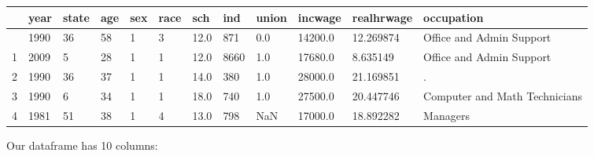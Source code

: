 \documentclass[
  letterpaper,
  DIV=11,
  numbers=noendperiod]{scrreprt}
\begin{document}
\begin{longtable}[]{@{}llllllllllll@{}}
\toprule\noalign{}
& year & state & age & sex & race & sch & ind & union & incwage &
realhrwage & occupation \\
\midrule\noalign{}
\endhead
\bottomrule\noalign{}
\endlastfoot
0 & 1990 & 36 & 58 & 1 & 3 & 12.0 & 871 & 0.0 & 14200.0 & 12.269874 &
Office and Admin Support \\
1 & 2009 & 5 & 28 & 1 & 1 & 12.0 & 8660 & 1.0 & 17680.0 & 8.635149 &
Office and Admin Support \\
2 & 1990 & 36 & 37 & 1 & 1 & 14.0 & 380 & 1.0 & 28000.0 & 21.169851 &
. \\
3 & 1990 & 6 & 34 & 1 & 1 & 18.0 & 740 & 1.0 & 27500.0 & 20.447746 &
Computer and Math Technicians \\
4 & 1981 & 51 & 38 & 1 & 4 & 13.0 & 798 & NaN & 17000.0 & 18.892282 &
Managers \\
\end{longtable}

Our dataframe has 10 columns:
\end{document}
